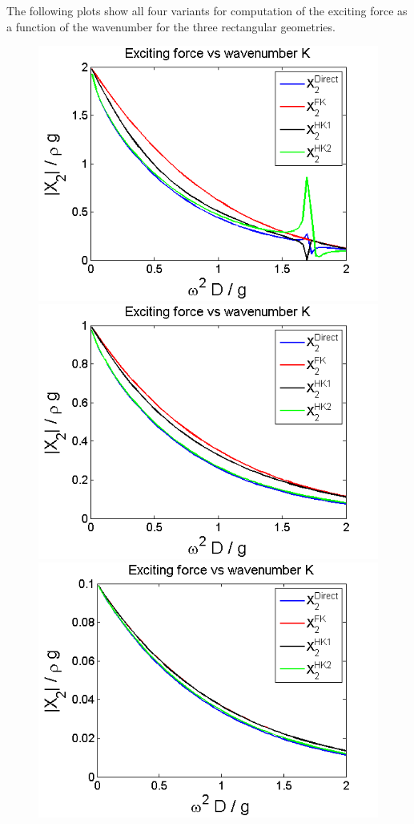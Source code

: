 \documentclass[a4paper,10pt]{article}
\begin{document}
The following plots show all four variants for computation of the exciting force as a function of the wavenumber for the three rectangular geometries.

\begin{figure}[H]
  \includegraphics[width=\linewidth]{X2_2_box1.png}
  \caption{}\label{X2_2_box1}
\endminipage
{}
  \includegraphics[width=\linewidth]{X2_2_box2.png}
  \caption{}\label{X2_2_box2}
\endminipage
{}%
  \includegraphics[width=\linewidth]{X2_2_box3.png}

\end{figure}
\end{document}
